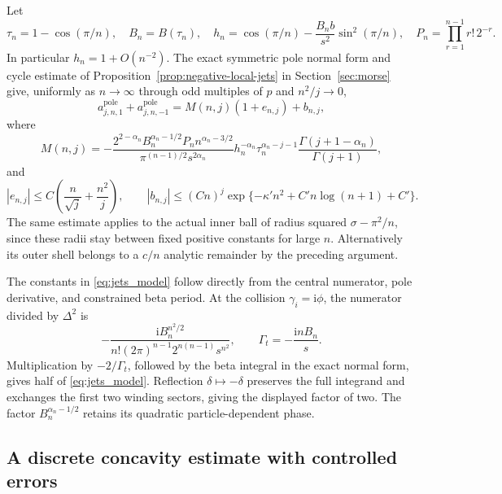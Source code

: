 \documentclass[11pt]{article}
\numberwithin{equation}{section}
\theoremstyle{definition}
\newcommand{\ii}{\mathrm i}
\begin{document}
Let
\begin{equation}\label{eq:jets_model_parameters}
 \tau_n=1-\cos(\pi/n),\quad B_n=B(\tau_n),\quad
 h_n=\cos(\pi/n)-\frac{B_n b}{s^2}\sin^2(\pi/n),\quad
 P_n=\prod_{r=1}^{n-1}r!\,2^{-r}.
\end{equation}
In particular $h_n=1+O(n^{-2})$. The exact symmetric pole normal
form and cycle estimate of Proposition~\ref{prop:negative-local-jets}
in Section~\ref{sec:morse} give, uniformly
as $n\to\infty$ through odd multiples of $p$ and $n^2/j\to0$,
\begin{equation}\label{eq:jets_uniform_model}
 a_{j,n,1}^{\mathrm{pole}}+a_{j,n,-1}^{\mathrm{pole}}
 =M(n,j)(1+e_{n,j})+b_{n,j},
\end{equation}
where
\begin{equation}\label{eq:jets_model}
 M(n,j)=-\frac{2^{2-\alpha_n}B_n^{\alpha_n-1/2}P_n
                     n^{\alpha_n-3/2}}
                   {\pi^{(n-1)/2}s^{2\alpha_n}}
 h_n^{-\alpha_n}\tau_n^{\alpha_n-j-1}
 \frac{\Gamma(j+1-\alpha_n)}{\Gamma(j+1)},
\end{equation}
and
\begin{equation}\label{eq:jets_model_errors}
 |e_{n,j}|\le C\left(\frac n{\sqrt j}+\frac{n^2}j\right),\qquad
 |b_{n,j}|\le(Cn)^j
       \exp\{-\kappa' n^2+C'n\log(n+1)+C'\}.
\end{equation}
The same estimate applies to the actual inner ball of radius squared
$\sigma-\pi^2/n$, since these radii stay between fixed positive
constants for large $n$. Alternatively its outer shell belongs to a
$c/n$ analytic remainder by the preceding argument.

The constants in \eqref{eq:jets_model} follow directly from the central
numerator, pole derivative, and constrained beta period.
At the collision $\gamma_i=\ii\phi$, the numerator divided by
$\Delta^2$ is
\[
 -\frac{\ii B_n^{n^2/2}}
       {n!(2\pi)^{n-1}2^{n(n-1)}s^{n^2}},
 \qquad \Gamma_t=-\frac{\ii nB_n}s.
\]
Multiplication by $-2/\Gamma_t$, followed by the beta integral in
the exact normal form, gives half of \eqref{eq:jets_model}.
Reflection $\delta\mapsto-\delta$ preserves the full integrand and
exchanges the first two winding sectors, giving the displayed
factor of two. The factor $B_n^{\alpha_n-1/2}$ retains its quadratic
particle-dependent phase.

\subsection{A discrete concavity estimate with controlled errors}
\end{document}
